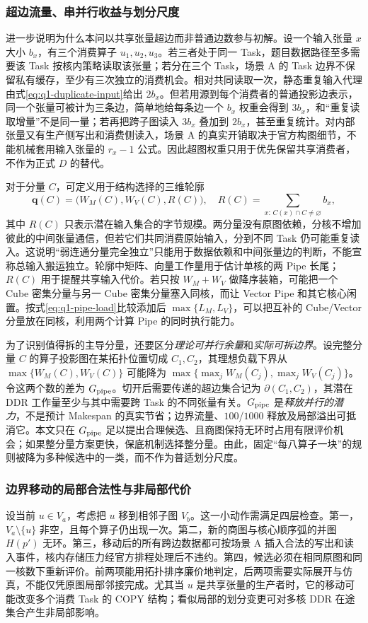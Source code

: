 \subsubsection{超边流量、串并行收益与划分尺度}
进一步说明为什么本问以共享张量超边而非普通边数参与初解。设一个输入张量 $x$ 大小 $b_x$，有三个消费算子 $u_1,u_2,u_3$。若三者处于同一 Task，题目数据路径至多需要该 Task 按核内策略读取该张量；若分在三个 Task，场景 A 的 Task 边界不保留私有缓存，至少有三次独立的消费机会。相对共同读取一次，静态重复输入代理由式\eqref{eq:q1-duplicate-input}给出 $2b_x$。但若用源到每个消费者的普通投影边表示，同一个张量可被计为三条边，简单地给每条边一个 $b_x$ 权重会得到 $3b_x$，和“重复读取增量”不是同一量；若再把跨子图读入 $3b_x$ 叠加到 $2b_x$，甚至重复统计。对内部张量又有生产侧写出和消费侧读入，场景 A 的真实开销取决于官方构图细节，不能机械套用输入张量的 $r_x-1$ 公式。因此超图权重只用于优先保留共享消费者，不作为正式 $D$ 的替代。

对于分量 $C$，可定义用于结构选择的三维轮廓
\begin{equation}\label{eq:q1-component-profile}
\mathbf q(C)=\bigl(W_M(C),W_V(C),R(C)\bigr),
\quad R(C)=\sum_{x:\,C(x)\cap C\ne\varnothing}b_x,
\end{equation}
其中 $R(C)$ 只表示潜在输入集合的字节规模。两分量没有原图依赖，分核不增加彼此的中间张量通信，但若它们共同消费原始输入，分到不同 Task 仍可能重复读入。这说明“弱连通分量完全独立”只能用于数据依赖和中间张量边的判断，不能宣称总输入搬运独立。轮廓中矩阵、向量工作量用于估计单核的两 Pipe 长尾；$R(C)$ 用于提醒共享输入代价。若只按 $W_M+W_V$ 做降序装箱，可能把一个 Cube 密集分量与另一 Cube 密集分量塞入同核，而让 Vector Pipe 和其它核心闲置。按式\eqref{eq:q1-pipe-load}比较添加后 $\max\{L_M,L_V\}$，可以把互补的 Cube/Vector 分量放在同核，利用两个计算 Pipe 的同时执行能力。

为了识别值得拆的主导分量，还要区分\emph{理论可并行余量}和\emph{实际可拆边界}。设完整分量 $C$ 的算子投影图在某拓扑位置切成 $C_1,C_2$，其理想负载下界从 $\max\{W_M(C),W_V(C)\}$ 可能降为 $\max\{\max_jW_M(C_j),\max_jW_V(C_j)\}$。令这两个数的差为 $G_{\rm pipe}$。切开后需要传递的超边集合记为 $\partial(C_1,C_2)$，其潜在 DDR 工作量至少与其中需要跨 Task 的不同张量有关。$G_{\rm pipe}$ 是\emph{释放并行的潜力}，不是预计 Makespan 的真实节省；边界流量、$100$/$1000$ 释放及局部溢出可抵消它。本文只在 $G_{\rm pipe}$ 足以提出合理候选、且商图保持无环时占用有限评价机会；如果整分量方案更快，保底机制选择整分量。由此，固定“每八算子一块”的规则被降为多种候选中的一类，而不作为普适划分尺度。

\subsubsection{边界移动的局部合法性与非局部代价}
设当前 $u\in V_a$，考虑把 $u$ 移到相邻子图 $V_b$。这一小动作需满足四层检查。第一，$V_a\setminus\{u\}$ 非空，且每个算子仍出现一次。第二，新的商图与核心顺序弧的并图 $H(p')$ 无环。第三，移动后的所有跨边数据都可按场景 A 插入合法的写出和读入事件，核内存储压力经官方排程处理后不违约。第四，候选必须在相同原图和同一核数下重新评价。前两项能用拓扑排序廉价地判定，后两项需要实际展开与仿真，不能仅凭原图局部邻接完成。尤其当 $u$ 是共享张量的生产者时，它的移动可能改变多个消费 Task 的 COPY 结构；看似局部的划分变更可对多核 DDR 在途集合产生非局部影响。

